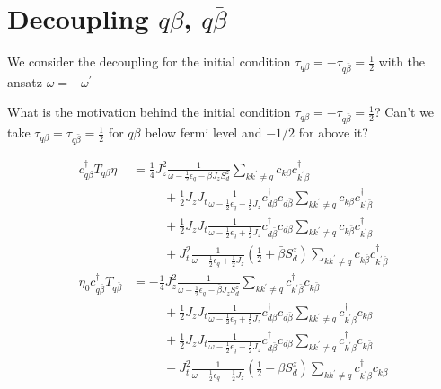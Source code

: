 \documentclass[14pt]{extarticle}
\numberwithin{equation}{section}
\begin{document}
\section{Decoupling $q\beta$, $q\bar{\beta}$}
We consider the decoupling for the initial condition $\tau_{q\beta} = - \tau_{q\bar{\beta}} = \frac{1}{2}$ with the ansatz $\omega = -\omega^{\prime}$

\hypertarget{q1}{{\color{red} What is the motivation behind the initial condition $\tau_{q\beta} = - \tau_{q\bar{\beta}} = \frac{1}{2}$? Can't we take $\tau_{q\beta} =  \tau_{q\bar{\beta}} = \frac{1}{2}$ for $q\beta$ below fermi level and $-1/2$ for above it?}}

\begin{align}
  c^{\dag}_{q\beta}T_{q\beta}\eta  &=  \frac{1}{4} J_z^2 \frac{1}{\omega - \frac{1}{2} \epsilon_q - \beta J_zS_d^z}  \sum\limits_{kk^{\prime}\ne q} c_{k\beta}c^{\dag}_{k^{\prime}\beta} \nonumber\\
&\hspace{30pt} + \frac{1}{2} J_z J_t\frac{1}{\omega - \frac{1}{2}\epsilon_q - \frac{1}{2}J_z}  c^{\dag}_{d\beta} c_{d\bar{\beta}} \sum\limits_{kk^{\prime}\ne q}  c_{k\beta} c^{\dag}_{k^{\prime}\bar{\beta}} \nonumber\\
&\hspace{30pt} +   \frac{1}{2} J_z J_t\frac{1}{\omega - \frac{1}{2}\epsilon_q + \frac{1}{2}J_z} c^{\dag}_{d\bar{\beta}} c_{d\beta} \sum\limits_{kk^{\prime}\ne q}  c_{k\bar{\beta}}  c^{\dag}_{k^{\prime}\beta} \nonumber\\
&\hspace{30pt} + J_t^2 \frac{1}{\omega - \frac{1}{2}\epsilon_q + \frac{1}{2} J_z} \left( \frac{1}{2} + \bar{\beta} S_d^z \right) \sum\limits_{kk^{\prime}\ne q} c_{k\bar{\beta}} c^{\dag}_{k^{\prime}\bar{\beta}} \label{eq:36} \\
  \eta_0 c^{\dag}_{q\bar{\beta}}T_{q\bar{\beta}} &= -\frac{1}{4} J_z^2 \frac{1}{\omega - \frac{1}{2} \epsilon_q -\bar{\beta} J_zS^z_d }  \sum\limits_{kk^{\prime}\ne q} c^{\dag}_{k^{\prime}\bar{\beta}} c_{k\bar{\beta}} \nonumber\\
&\hspace{30pt} + \frac{1}{2} J_z J_t  \frac{1}{\omega- \frac{1}{2}\epsilon_q + \frac{1}{2} J_z} c^{\dag}_{d\beta} c_{d\bar{\beta}} \sum\limits_{kk^{\prime}\ne q}  c^{\dag}_{k^{\prime}\bar{\beta}}c_{k\beta} \nonumber\\
&\hspace{30pt} + \frac{1}{2} J_z J_t  \frac{1}{\omega- \frac{1}{2}\epsilon_q - \frac{1}{2} J_z} c^{\dag}_{d\bar{\beta}} c_{d\beta} \sum\limits_{kk^{\prime}\ne q}  c^{\dag}_{k^{\prime}\beta}c_{k\bar{\beta}} \nonumber\\
&\hspace{30pt} - J_t^2 \frac{1}{\omega- \frac{1}{2}\epsilon_q - \frac{1}{2} J_z} \left( \frac{1}{2} - \beta S_d^z \right) \sum\limits_{kk^{\prime}\ne q} c^{\dag}_{k^{\prime}\beta}c_{k\beta}  \label{eq:37}
\end{align}
\end{document}
